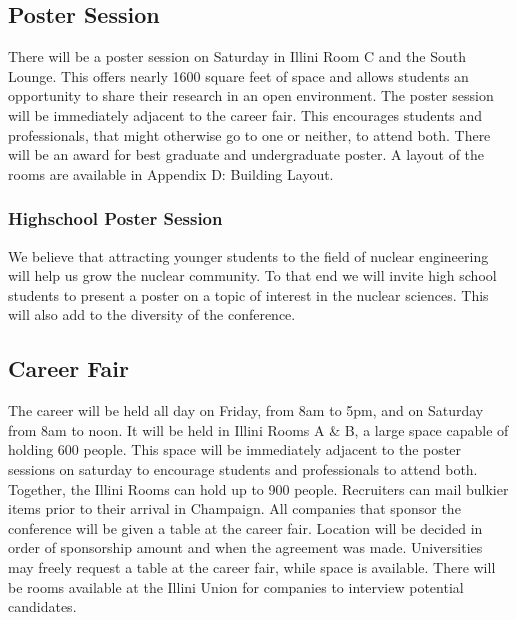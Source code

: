 \subsection{Poster Session}
There will be a poster session on Saturday in Illini Room C and the South Lounge. This offers nearly 1600 square feet of space and allows students an opportunity to share their research in an open environment. The poster session will be immediately adjacent to the career fair. This encourages students and professionals, that might otherwise go to one or neither, to attend both. There will be an award for best graduate and undergraduate poster. A layout of the rooms are available in Appendix D: Building Layout.

\subsubsection{Highschool Poster Session}
We believe that attracting younger students to the field of nuclear engineering will help us grow the nuclear community. To that end we will invite high school students to present a poster on a topic of interest in the nuclear sciences. This will also add to the diversity of the conference.

\subsection{Career Fair}
The career will be held all day on Friday, from 8am to 5pm, and on Saturday from 8am to noon. It will be held in Illini Rooms A \& B, a large space capable of holding 600 people. This space will be immediately adjacent to the poster sessions on saturday to encourage students and professionals to attend both. Together, the Illini Rooms can hold up to 900 people. Recruiters can mail bulkier items prior to their arrival in Champaign. All companies that sponsor the conference will be given a table at the career fair. Location will be decided in order of sponsorship amount and when the agreement was made. Universities may freely request a table at the career fair, while space is available. There will be rooms available at the Illini Union for companies to interview potential candidates. 


